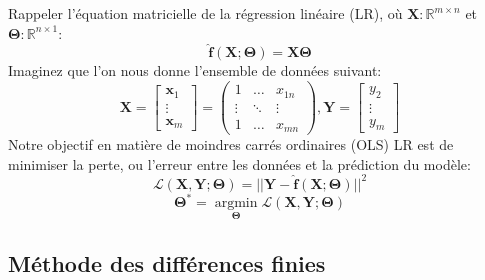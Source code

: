 \noindent Rappeler l'équation matricielle de la régression linéaire (LR), où $\mathbf{X} : \mathbb{R}^{m \times n}$ et $\bm\Theta : \mathbb{R}^{n \times 1}$:
%
\begin{equation}\label{eq:lin_reg}
\mathbf{\hat f}(\mathbf{X}; \bm\Theta) = \mathbf{X}\bm\Theta
\end{equation}
%
Imaginez que l'on nous donne l'ensemble de données suivant:
%
\begin{equation}
\mathbf{X} =
\begin{bmatrix}
\mathbf{x}_1 \\
\vdots \\
\mathbf{x}_m
\end{bmatrix} =
\begin{pmatrix}
1 & \ldots & x_{1n} \\
\vdots & \ddots & \vdots \\
1 & \ldots & x_{mn}
\end{pmatrix},
\mathbf{Y} =
\begin{bmatrix}
y_2 \\
\vdots \\
y_m
\end{bmatrix}
\end{equation}
%
Notre objectif en matière de moindres carrés ordinaires (OLS) LR est de minimiser la perte, ou l'erreur entre les données et la prédiction du modèle:
%
\begin{equation}
\mathcal{L}(\mathbf{X}, \mathbf{Y}; \bm\Theta) = ||\mathbf{Y} - \mathbf{\hat f}(\mathbf{X}; \bm\Theta)||^2
\end{equation}
%
\begin{equation}
\bm\Theta^* = \underset{\bm\Theta}{\operatorname{argmin}}\mathcal{L}(\mathbf{X}, \mathbf{Y}; \bm\Theta)
\end{equation}

\subsection{Méthode des différences finies}\label{sec:fdm}

